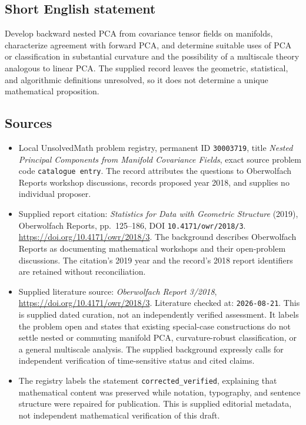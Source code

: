 \documentclass[11pt]{article}
\begin{document}
\subsection{Short English statement}
Develop backward nested PCA from covariance tensor fields on manifolds, characterize agreement with forward PCA, and determine suitable uses of PCA or classification in substantial curvature and the possibility of a multiscale theory analogous to linear PCA. The supplied record leaves the geometric, statistical, and algorithmic definitions unresolved, so it does not determine a unique mathematical proposition.
\subsection{Sources}
\begin{itemize}
\item Local UnsolvedMath problem registry, permanent ID \texttt{30003719}, title \emph{Nested Principal Components from Manifold Covariance Fields}, exact source problem code \texttt{catalogue entry}. The record attributes the questions to Oberwolfach Reports workshop discussions, records proposed year 2018, and supplies no individual proposer.
\item Supplied report citation: \emph{Statistics for Data with Geometric Structure} (2019), Oberwolfach Reports, pp.\ 125--186, DOI \texttt{10.4171/owr/2018/3}. \url{https://doi.org/10.4171/owr/2018/3}. The background describes Oberwolfach Reports as documenting mathematical workshops and their open-problem discussions. The citation's 2019 year and the record's 2018 report identifiers are retained without reconciliation.
\item Supplied literature source: \emph{Oberwolfach Report 3/2018}, \url{https://doi.org/10.4171/owr/2018/3}. Literature checked at: \texttt{2026-08-21}. This is supplied dated curation, not an independently verified assessment. It labels the problem open and states that existing special-case constructions do not settle nested or commuting manifold PCA, curvature-robust classification, or a general multiscale analysis. The supplied background expressly calls for independent verification of time-sensitive status and cited claims.
\item The registry labels the statement \texttt{corrected\_verified}, explaining that mathematical content was preserved while notation, typography, and sentence structure were repaired for publication. This is supplied editorial metadata, not independent mathematical verification of this draft.
\end{itemize}
\end{document}
